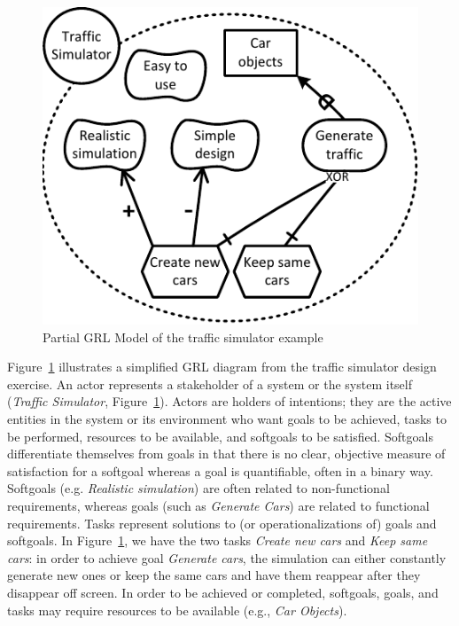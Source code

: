 \begin{figure}[b]
\centering
\includegraphics[width=\columnwidth]{img/Example1.pdf}
\caption{Partial GRL Model of the traffic simulator example}
\label{fig:example-small}
\end{figure} 



Figure~\ref{fig:example-small} illustrates a simplified GRL diagram from the traffic simulator design exercise. An actor represents a stakeholder of a system or the system itself (\emph{Traffic Simulator}, Figure~\ref{fig:example-small}). Actors are holders of intentions; they are the active entities in the system or its environment who want goals to be achieved, tasks to be performed, resources to be available, and softgoals to be satisfied. Softgoals differentiate themselves from goals in that there is no clear, objective measure of satisfaction for a softgoal whereas a goal is quantifiable, often in a binary way. Softgoals (e.g. \emph{Realistic simulation}) are often related to non-functional requirements, whereas goals (such as \emph{Generate Cars}) are related to functional requirements. Tasks represent solutions to (or operationalizations of) goals and softgoals. In Figure~\ref{fig:example-small}, we have the two tasks \emph{Create new cars} and \emph{Keep same cars}: in order to achieve goal \emph{Generate cars}, the simulation can either constantly generate new ones or keep the same cars and have them reappear after they disappear off screen. In order to be achieved or completed, softgoals, goals, and tasks may require resources to be available (e.g., \emph{Car Objects}).

